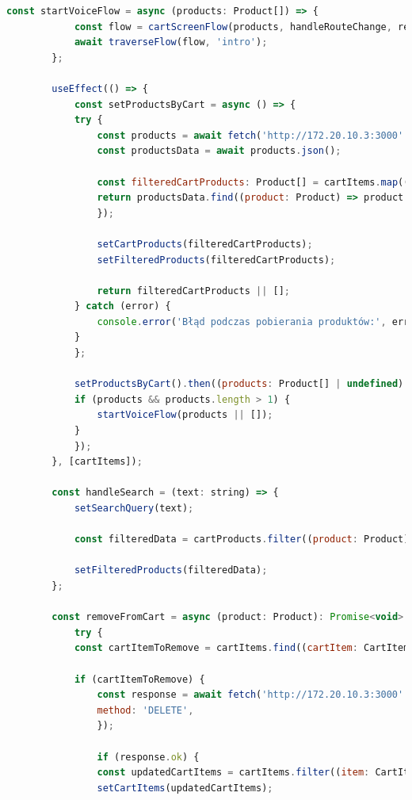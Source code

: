 \begin{lstlisting}[language=JavaScript, caption=Koszyk użytkownika implementacja, label=lst:view]
        const startVoiceFlow = async (products: Product[]) => {
            const flow = cartScreenFlow(products, handleRouteChange, removeFromCart);
            await traverseFlow(flow, 'intro');
        };

        useEffect(() => {
            const setProductsByCart = async () => {
            try {
                const products = await fetch('http://172.20.10.3:3000' + `/products`);
                const productsData = await products.json();

                const filteredCartProducts: Product[] = cartItems.map((cartItem: CartItem) => {
                return productsData.find((product: Product) => product.product_id === cartItem.product_id);
                });

                setCartProducts(filteredCartProducts);
                setFilteredProducts(filteredCartProducts);

                return filteredCartProducts || [];
            } catch (error) {
                console.error('Błąd podczas pobierania produktów:', error);
            }
            };

            setProductsByCart().then((products: Product[] | undefined) => {
            if (products && products.length > 1) {
                startVoiceFlow(products || []);
            }
            });
        }, [cartItems]);

        const handleSearch = (text: string) => {
            setSearchQuery(text);

            const filteredData = cartProducts.filter((product: Product) => product.name.toLowerCase().includes(text.toLowerCase()));

            setFilteredProducts(filteredData);
        };

        const removeFromCart = async (product: Product): Promise<void> => {
            try {
            const cartItemToRemove = cartItems.find((cartItem: CartItem) => cartItem.product_id === product.product_id);

            if (cartItemToRemove) {
                const response = await fetch('http://172.20.10.3:3000' + `/cart-items/${cartItemToRemove.cart_item_id}`, {
                method: 'DELETE',
                });

                if (response.ok) {
                const updatedCartItems = cartItems.filter((item: CartItem) => item.cart_item_id !== cartItemToRemove.cart_item_id);
                setCartItems(updatedCartItems);


\end{lstlisting}
